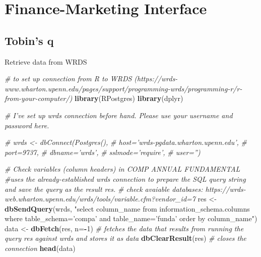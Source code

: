 \documentclass[
]{book}
\newenvironment{Shaded}{\begin{snugshade}}{\end{snugshade}}
\newcommand{\CommentTok}[1]{\textcolor[rgb]{0.56,0.35,0.01}{\textit{#1}}}
\newcommand{\DataTypeTok}[1]{\textcolor[rgb]{0.13,0.29,0.53}{#1}}
\newcommand{\DecValTok}[1]{\textcolor[rgb]{0.00,0.00,0.81}{#1}}
\newcommand{\KeywordTok}[1]{\textcolor[rgb]{0.13,0.29,0.53}{\textbf{#1}}}
\newcommand{\NormalTok}[1]{#1}
\newcommand{\OperatorTok}[1]{\textcolor[rgb]{0.81,0.36,0.00}{\textbf{#1}}}
\newcommand{\StringTok}[1]{\textcolor[rgb]{0.31,0.60,0.02}{#1}}
\begin{document}
\hypertarget{finance-marketing-interface}{%
\chapter{Finance-Marketing Interface}\label{finance-marketing-interface}}

\hypertarget{tobins-q}{%
\section{Tobin's q}\label{tobins-q}}

Retrieve data from WRDS

\begin{Shaded}
\begin{Highlighting}[]
\CommentTok{# to set up connection from R to WRDS (https://wrds-www.wharton.upenn.edu/pages/support/programming-wrds/programming-r/r-from-your-computer/)}
\KeywordTok{library}\NormalTok{(RPostgres)}
\KeywordTok{library}\NormalTok{(dplyr)}

\CommentTok{# I've set up wrds connection before hand. Please use your username and password here.}

\CommentTok{# wrds <- dbConnect(Postgres(),}
\CommentTok{#                   host='wrds-pgdata.wharton.upenn.edu',}
\CommentTok{#                   port=9737,}
\CommentTok{#                   dbname='wrds',}
\CommentTok{#                   sslmode='require',}
\CommentTok{#                   user='')}

\CommentTok{# Check variables (column headers) in COMP ANNUAL FUNDAMENTAL}
\CommentTok{#uses the already-established wrds connection to prepare the SQL query string and save the query as the result res.}
\CommentTok{# check avaiable databases: https://wrds-web.wharton.upenn.edu/wrds/tools/variable.cfm?vendor_id=7}
\NormalTok{res <-}\StringTok{ }\KeywordTok{dbSendQuery}\NormalTok{(wrds, }\StringTok{"select column_name}
\StringTok{                   from information_schema.columns}
\StringTok{                   where table_schema='compa'}
\StringTok{                   and table_name='funda'}
\StringTok{                   order by column_name"}\NormalTok{)}
\NormalTok{data <-}\StringTok{ }\KeywordTok{dbFetch}\NormalTok{(res, }\DataTypeTok{n=}\OperatorTok{-}\DecValTok{1}\NormalTok{) }\CommentTok{# fetches the data that results from running the query res against wrds and stores it as data}
\KeywordTok{dbClearResult}\NormalTok{(res) }\CommentTok{# closes the connection}
\KeywordTok{head}\NormalTok{(data)}
\end{Highlighting}
\end{Shaded}
\end{document}
